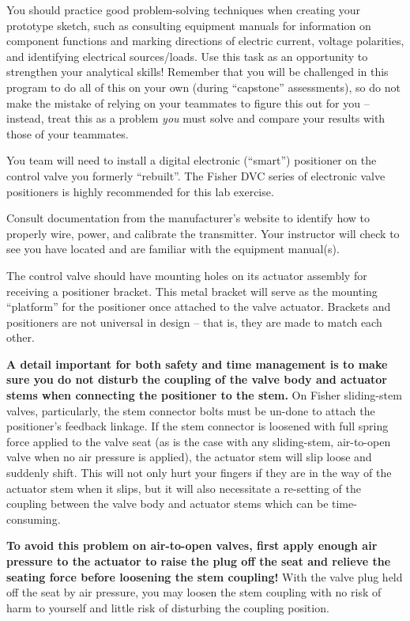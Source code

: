 \documentclass[12pt,a4paper]{article}
\begin{document}
\begin{itemize}
You should practice good problem-solving techniques when creating your prototype sketch, such as consulting equipment manuals for information on component functions and marking directions of electric current, voltage polarities, and identifying electrical sources/loads.  Use this task as an opportunity to strengthen your analytical skills!  Remember that you will be challenged in this program to do all of this on your own (during ``capstone'' assessments), so do not make the mistake of relying on your teammates to figure this out for you -- instead, treat this as a problem {\it you} must solve and compare your results with those of your teammates.

\vskip 10pt

You team will need to install a digital electronic (``smart'') positioner on the control valve you formerly ``rebuilt''.  The Fisher DVC series of electronic valve positioners is highly recommended for this lab exercise.

Consult documentation from the manufacturer's website to identify how to properly wire, power, and calibrate the transmitter.  Your instructor will check to see you have located and are familiar with the equipment manual(s).

The control valve should have mounting holes on its actuator assembly for receiving a positioner bracket.  This metal bracket will serve as the mounting ``platform'' for the positioner once attached to the valve actuator.  Brackets and positioners are not universal in design -- that is, they are made to match each other.

\vskip 10pt

{\bf A detail important for both safety and time management is to make sure you do not disturb the coupling of the valve body and actuator stems when connecting the positioner to the stem.}  On Fisher sliding-stem valves, particularly, the stem connector bolts must be un-done to attach the positioner's feedback linkage.  If the stem connector is loosened with full spring force applied to the valve seat (as is the case with any sliding-stem, air-to-open valve when no air pressure is applied), the actuator stem will slip loose and suddenly shift.  This will not only hurt your fingers if they are in the way of the actuator stem when it slips, but it will also necessitate a re-setting of the coupling between the valve body and actuator stems which can be time-consuming.

{\bf To avoid this problem on air-to-open valves, first apply enough air pressure to the actuator to raise the plug off the seat and relieve the seating force before loosening the stem coupling!}  With the valve plug held off the seat by air pressure, you may loosen the stem coupling with no risk of harm to yourself and little risk of disturbing the coupling position.


\end{itemize}
\end{document}

